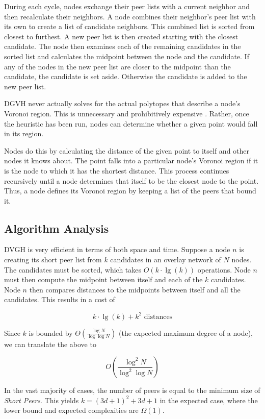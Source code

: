 During each cycle, nodes exchange their peer lists with a current neighbor and then recalculate their neighbors.
A node combines their neighbor's peer list with its own to create a list of candidate neighbors.
This combined list is sorted from closest to furthest.
A new peer list is then created starting with the closest candidate.
The node then examines each of the remaining candidates in the sorted list and calculates the midpoint between the node and the candidate.
If any of the nodes in the new peer list are closer to the midpoint than the candidate, the candidate is set aside.
Otherwise the candidate is added to the new peer list.


DGVH never actually solves for the actual polytopes that describe a node's Voronoi region.
This is unnecessary and prohibitively expensive \cite{raynet}.
Rather, once the heuristic has been run, nodes can determine whether a given point would fall in its region.

Nodes do this by calculating the distance of the given point to itself and other nodes it knows about.
The point falls into a particular node's Voronoi region if it is the node to which it has the shortest distance.
This process continues recursively until a node determines that itself to be the closest node to the point.
Thus, a node defines its Voronoi region by keeping a list of the peers that bound it.



\subsection{Algorithm Analysis}

DVGH is very efficient in terms of both space and time.
Suppose a node $n$ is creating its short peer list from $k$ candidates in an overlay network of $N$ nodes.
The candidates must be sorted, which takes $O(k\cdot\lg(k))$ operations.
Node $n$ must then compute the midpoint between itself and each of the $k$ candidates.
Node $n$ then compares distances to the midpoints between itself and all the candidates.
This results in a cost of

\[ k\cdot\lg(k) + k^{2} \text{ distances} \]


Since $k$ is  bounded by $\Theta(\frac{\log N}{\log \log N} )$ \cite{bern1991expected} (the expected maximum degree of a node), we can translate the above to

\[O(\frac{\log^{2} N}{\log^{2} \log N} )\]

In the vast majority of cases, the number of peers is equal to the minimum size of \textit{Short Peers}.
This yields $k=(3d+1)^{2}+3d+1$ in the expected case, where the lower bound and expected complexities are $\Omega(1)$.




